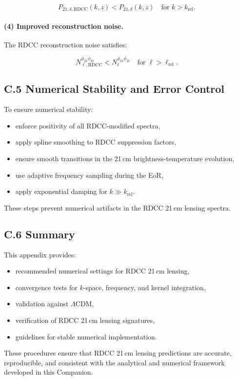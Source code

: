 \documentclass[11pt,a4paper]{article}
\begin{document}
\[
P_{21,\delta,\mathrm{RDCC}}(k,z)
<
P_{21,\delta}(k,z)
\quad \text{for } k > k_{\mathrm{rel}}.
\]



\paragraph{(4) Improved reconstruction noise.}
The RDCC reconstruction noise satisfies:


\[
N_{\ell,\mathrm{RDCC}}^{\phi_{21}\phi_{21}}
<
N_{\ell}^{\phi_{21}\phi_{21}}
\quad \text{for } \ell > \ell_{\mathrm{rel}}.
\]



\subsection*{C.5 Numerical Stability and Error Control}

To ensure numerical stability:

\begin{itemize}
\item enforce positivity of all RDCC-modified spectra,
\item apply spline smoothing to RDCC suppression factors,
\item ensure smooth transitions in the 21\,cm brightness-temperature evolution,
\item use adaptive frequency sampling during the EoR,
\item apply exponential damping for $k \gg k_{\mathrm{rel}}$.
\end{itemize}

These steps prevent numerical artifacts in the RDCC 21\,cm lensing spectra.

\subsection*{C.6 Summary}

This appendix provides:
\begin{itemize}
\item recommended numerical settings for RDCC 21\,cm lensing,
\item convergence tests for $k$-space, frequency, and kernel integration,
\item validation against $\Lambda$CDM,
\item verification of RDCC 21\,cm lensing signatures,
\item guidelines for stable numerical implementation.
\end{itemize}

These procedures ensure that RDCC 21\,cm lensing predictions are accurate, reproducible, and
consistent with the analytical and numerical framework developed in this Companion.
\end{document}
